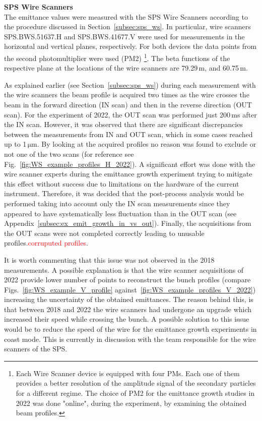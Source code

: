 \textbf{SPS Wire Scanners}\\
The emittance values were measured with the SPS Wire Scanners according to the procedure discussed in Section~\ref{subsec:sps_ws}. In particular, wire scanners SPS.BWS.51637.H and SPS.BWS.41677.V were used for measurements in the horizontal and vertical planes, respectively. For both devices the data points from the second photomultiplier were used (PM2) \footnote{Each Wire Scanner device is equipped with four PMs. Each one of them provides a better resolution of the amplitude signal of the secondary particles for a different regime. The choice of PM2 for the emittance growth studies in 2022 was done "online", during the experiment, by examining the obtained beam profiles.}. The beta functions of the respective plane at the locations of the wire scanners are 79.29\,m, and  60.75\,m. 

As explained earlier (see Section~\ref{subsec:sps_ws}) during each measurement with the wire scanners the beam profile is acquired two times as the wire crosses the beam in the forward direction (IN scan) and then in the reverse direction (OUT scan). For the experiment of 2022, the OUT scan was performed just 200\,ms after the IN scan. However, it was observed that there are significant discrepancies between the measurements from IN and OUT scan, which in some cases reached up to 1\,$\mathrm{\mu m}$. By looking at the acquired profiles no reason was found to exclude or not one of the two scans (for reference see Fig.~\ref{fig:WS_example_profiles_H_2022}). A significant effort was done with the wire scanner experts during the emittance growth experiment trying to mitigate this effect without success due to limitations on the hardware of the current instrument. Therefore, it was decided that the post-process analysis would be performed taking into account only the IN scan measurements since they appeared to have systematically less fluctuation than in the OUT scan (see Appendix~\ref{subsec:ex_emit_growth_in_vs_out}). Finally, the acquisitions from the OUT scans were not completed correctly leading to unusable profiles.\textcolor{red}{corruputed profiles}. 

It is worth commenting that this issue was not observed in the 2018 measurements. A possible explanation is that the wire scanner acquisitions of 2022 provide lower number of points to reconstruct the bunch profiles (compare Figs.~\ref{fig:WS_example_V_profile} against~\ref{fig:WS_example_profiles_V_2022}) increasing the uncertainty of the obtained emittances. The reason behind this, is that between 2018 and 2022 the wire scanners had undergone an upgrade which increased their speed while crossing the bunch. A possible solution to this issue would be to reduce the speed of the wire for the emittance growth experiments in coast mode. This is currently in discussion with the team responsible for the wire scanners of the SPS.

